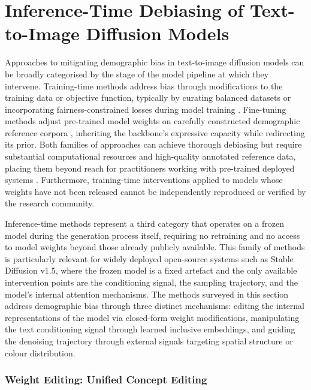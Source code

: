\section{Inference-Time Debiasing of Text-to-Image Diffusion 
	Models}

Approaches to mitigating demographic bias in text-to-image diffusion 
models can be broadly categorised by the stage of the model pipeline 
at which they intervene. Training-time methods address bias through 
modifications to the training data or objective function, typically 
by curating balanced datasets \cite{Yang_2020_FairerDatasets} or 
incorporating fairness-constrained losses during model training 
\cite{Zhang_2018_MitigatingUnwantedBiasesAdversarial}. Fine-tuning methods adjust 
pre-trained model weights on carefully constructed demographic 
reference corpora \cite{Friedrich_2023_FairDiffusionInstructingTextToImage}, inheriting 
the backbone's expressive capacity while redirecting its prior. Both 
families of approaches can achieve thorough debiasing but require 
substantial computational resources and high-quality annotated 
reference data, placing them beyond reach for practitioners working 
with pre-trained deployed systems \cite{Jiang_2025_FairGen}. 
Furthermore, training-time interventions applied to models whose 
weights have not been released cannot be independently reproduced 
or verified by the research community.

Inference-time methods represent a third category that operates on 
a frozen model during the generation process itself, requiring no 
retraining and no access to model weights beyond those already 
publicly available. This family of methods is particularly relevant 
for widely deployed open-source systems such as Stable Diffusion 
v1.5, where the frozen model is a fixed artefact and the only 
available intervention points are the conditioning signal, the 
sampling trajectory, and the model's internal attention mechanisms. 
The methods surveyed in this section address demographic bias through 
three distinct mechanisms: editing the internal representations of 
the model via closed-form weight modifications, manipulating the 
text conditioning signal through learned inclusive embeddings, and 
guiding the denoising trajectory through external signals targeting 
spatial structure or colour distribution.

\subsubsection*{Weight Editing: Unified Concept Editing}

